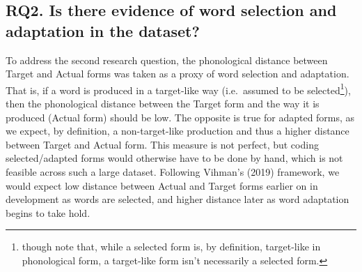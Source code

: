 \documentclass[
  man]{apa6}
\begin{document}
\subsection{RQ2. Is there evidence of word selection and adaptation in the dataset?}\label{rq2.-is-there-evidence-of-word-selection-and-adaptation-in-the-dataset}

To address the second research question, the phonological distance between Target and Actual forms was taken as a proxy of word selection and adaptation. That is, if a word is produced in a target-like way (i.e.~assumed to be selected\footnote{though note that, while a selected form is, by definition, target-like in phonological form, a target-like form isn't necessarily a selected form.}), then the phonological distance between the Target form and the way it is produced (Actual form) should be low. The opposite is true for adapted forms, as we expect, by definition, a non-target-like production and thus a higher distance between Target and Actual form. This measure is not perfect, but coding selected/adapted forms would otherwise have to be done by hand, which is not feasible across such a large dataset. Following Vihman's (2019) framework, we would expect low distance between Actual and Target forms earlier on in development as words are selected, and higher distance later as word adaptation begins to take hold.
\end{document}
